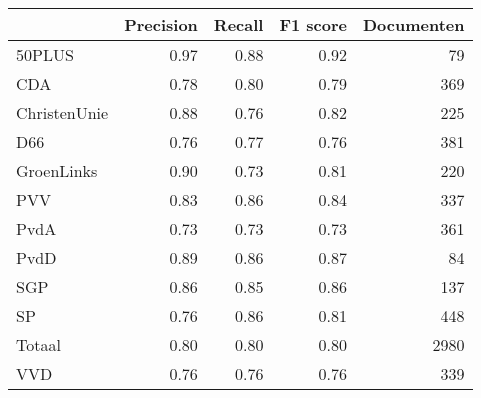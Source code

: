 \begin{tabular}{lrrrr}
\toprule
{} &  Precision &  Recall &  F1 score &  Documenten \\
\midrule
50PLUS       &       0.97 &    0.88 &      0.92 &          79 \\
CDA          &       0.78 &    0.80 &      0.79 &         369 \\
ChristenUnie &       0.88 &    0.76 &      0.82 &         225 \\
D66          &       0.76 &    0.77 &      0.76 &         381 \\
GroenLinks   &       0.90 &    0.73 &      0.81 &         220 \\
PVV          &       0.83 &    0.86 &      0.84 &         337 \\
PvdA         &       0.73 &    0.73 &      0.73 &         361 \\
PvdD         &       0.89 &    0.86 &      0.87 &          84 \\
SGP          &       0.86 &    0.85 &      0.86 &         137 \\
SP           &       0.76 &    0.86 &      0.81 &         448 \\
Totaal       &       0.80 &    0.80 &      0.80 &        2980 \\
VVD          &       0.76 &    0.76 &      0.76 &         339 \\
\bottomrule
\end{tabular}
